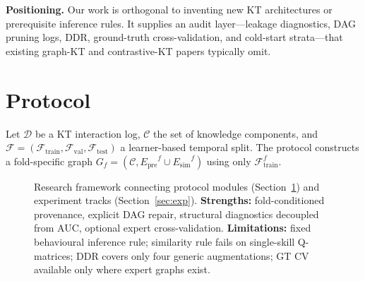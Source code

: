 \documentclass[runningheads]{llncs}
\newcommand{\Epre}{\ensuremath{E_{\text{pre}}}}
\newcommand{\Esim}{\ensuremath{E_{\text{sim}}}}
\newcommand{\KCs}{knowledge components}
\newcommand{\DDR}{\textsc{DDR}}
\begin{document}
\textbf{Positioning.}
Our work is orthogonal to inventing new KT architectures or prerequisite
inference rules. It supplies an audit layer---leakage diagnostics, DAG
pruning logs, \DDR{}, ground-truth cross-validation, and cold-start
strata---that existing graph-KT and contrastive-KT papers typically omit.
\section{Protocol}
\label{sec:protocol}
Let $\mathcal{D}$ be a KT interaction log, $\mathcal{C}$ the set of
\KCs{}, and $\mathcal{F}=(\mathcal{F}_{\text{train}},
\mathcal{F}_{\text{val}},\mathcal{F}_{\text{test}})$ a learner-based
temporal split. The protocol constructs a fold-specific graph
$G_f=(\mathcal{C},\Epre^f\cup\Esim^f)$ using only
$\mathcal{F}_{\text{train}}^f$.

\begin{figure}[!t]
\centering
{}
\caption{Research framework connecting protocol modules (Section~\ref{sec:protocol})
and experiment tracks (Section~\ref{sec:exp}).
\textbf{Strengths:} fold-conditioned provenance, explicit DAG repair,
structural diagnostics decoupled from AUC, optional expert cross-validation.
\textbf{Limitations:} fixed behavioural inference rule; similarity rule
fails on single-skill Q-matrices; \DDR{} covers only four generic augmentations;
GT CV available only where expert graphs exist.}
\label{fig:framework}
\end{figure}
\end{document}
